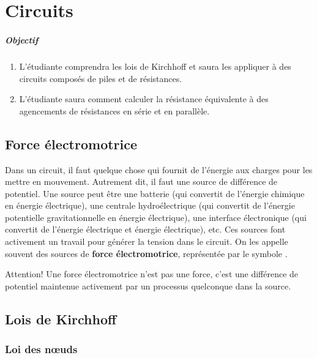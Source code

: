 \chapter{Circuits}

\paragraph{Objectif}

\begin{enumerate}
  \item L'étudiante comprendra les lois de Kirchhoff et saura les appliquer à
    des circuits composés de piles et de résistances.
  \item L'étudiante saura comment calculer la résistance équivalente à
    des agencements de résistances en série et en parallèle.
\end{enumerate}


\section{Force électromotrice}


Dans un circuit, il faut quelque chose qui fournit de l'énergie aux charges
pour les mettre en mouvement. Autrement dit, il faut une source de différence
de potentiel. Une source peut être une batterie (qui convertit de l'énergie
chimique en énergie électrique), une centrale hydroélectrique (qui convertit de
l'énergie potentielle gravitationnelle en énergie électrique), une interface
électronique (qui convertit de l'énergie électrique et énergie électrique),
etc. Ces sources font activement un travail pour générer la tension dans le
circuit. On les appelle souvent des sources de \textbf{force électromotrice},
représentée par le symbole \emf.

Attention! Une force électromotrice n'est pas une force, c'est une différence
de potentiel maintenue activement par un processus quelconque dans la source.


\section{Lois de Kirchhoff}


\subsection*{Loi des n\oe uds}

